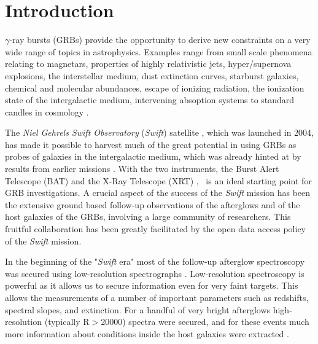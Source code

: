 \documentclass{aa}    %
\begin{document}
\maketitle

\section{Introduction}

$\gamma$-ray bursts (GRBs) provide the opportunity to derive new constraints on
a very wide range of topics in astrophysics. Examples range from small scale
phenomena relating to magnetars, properties of highly relativistic jets,
hyper/supernova explosions, the interstellar medium, dust extinction curves,
starburst galaxies, chemical and molecular abundances, escape of ionizing
radiation, the ionization state of the intergalactic medium, intervening
absoption systems to standard candles in cosmology \citep[e.g.,][]{Lyons2010,
	Molinari2007, HjorthBloom2012, Wijers1998, Prochaska2009, Savaglio2006,
	Ghirlanda2007, Vergani2009, Christensen2017}.

The \textit{Niel Gehrels Swift Observatory} ({\it Swift}) satellite
\citep{Gehrels2004, Gehrels2009}, which was launched in 2004, has made it
possible to harvest much of the great potential in using GRBs as probes of
galaxies in the intergalactic medium, which was already hinted at by results
from earlier missions \citep[e.g.,][]{Ricker2004}. With the two instruments, the
Burst Alert Telescope (BAT) \citep{Barthelmy2005} and the X-Ray Telescope (XRT)
\citep{Burrows2005}, \swift~is an ideal starting point for GRB investigations. A
crucial aspect of the success of the {\it Swift} mission has been the extensive
ground based follow-up observations of the afterglows and of the host galaxies
of the GRBs, involving a large community of researchers. This fruitful
collaboration has been greatly facilitated by the open data access policy of the
{\it Swift} mission.

In the beginning of the "{\it Swift} era" most of the follow-up afterglow
spectroscopy was secured using low-resolution spectrographs \citep[typically
R=$\lambda/\Delta\lambda$$<$1000, e.g.][]{Fynbo2009}. Low-resolution
spectroscopy is powerful as it allows us to secure information even for very faint
targets. This allows the measurements of a number of important parameters such
as redshifts, spectral slopes, and extinction. For a handful of very bright
afterglows high-resolution (typically R$>$20000) spectra were secured, and for
these events much more information about conditions inside the host galaxies
were extracted \citep[e.g.,][]{Fiore2005, Thone2007, Prochaska2007,
	Vreeswijk2007, Castro-Tirado2010}.
\end{document}
